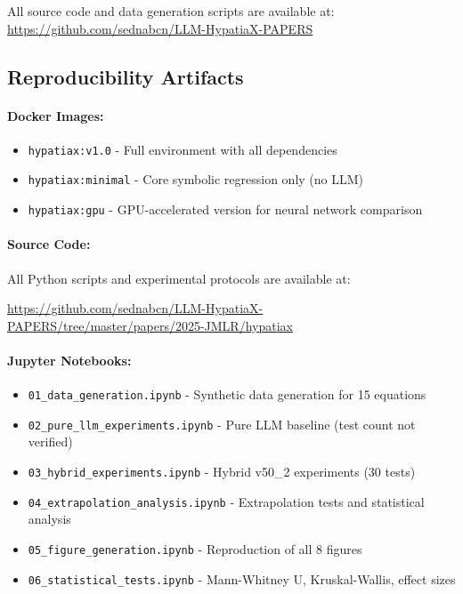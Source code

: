 \documentclass[twoside,11pt]{article}
\begin{document}
All source code and data generation scripts are available at:
\url{https://github.com/sednabcn/LLM-HypatiaX-PAPERS}

\subsection{Reproducibility Artifacts}

\paragraph{Docker Images:}
\begin{itemize}
\item \texttt{hypatiax:v1.0} - Full environment with all dependencies
\item \texttt{hypatiax:minimal} - Core symbolic regression only (no LLM)
\item \texttt{hypatiax:gpu} - GPU-accelerated version for neural network comparison
\end{itemize}

\paragraph{Source Code:}
All Python scripts and experimental protocols are available at:
\begin{center}
{\small\url{https://github.com/sednabcn/LLM-HypatiaX-PAPERS/tree/master/papers/2025-JMLR/hypatiax}}
\end{center}

 
\paragraph{Jupyter Notebooks:}
\begin{itemize}
\item \texttt{01\_data\_generation.ipynb} - Synthetic data generation for 15 equations
\item \texttt{02\_pure\_llm\_experiments.ipynb} - Pure LLM baseline (test count not verified)
\item \texttt{03\_hybrid\_experiments.ipynb} - Hybrid v50\_2 experiments (30 tests)
\item \texttt{04\_extrapolation\_analysis.ipynb} - Extrapolation tests and statistical analysis
\item \texttt{05\_figure\_generation.ipynb} - Reproduction of all 8 figures
\item \texttt{06\_statistical\_tests.ipynb} - Mann-Whitney U, Kruskal-Wallis, effect sizes
\end{itemize}
\end{document}

